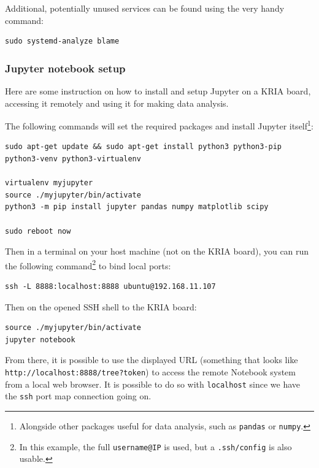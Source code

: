 \documentclass[10pt]{article}
\begin{document}
Additional, potentially unused services can be found using the very handy command:
\begin{verbatim}
sudo systemd-analyze blame
\end{verbatim}

\subsubsection{Jupyter notebook setup}
\label{sec:org242eb5c}
Here are some instruction on how to install and setup Jupyter on a KRIA board,
accessing it remotely and using it for making data analysis.

The following commands will set the required packages and install Jupyter itself\footnote{Alongside other packages useful for data analysis, such as \texttt{pandas} or \texttt{numpy}.}:
\begin{verbatim}
sudo apt-get update && sudo apt-get install python3 python3-pip python3-venv python3-virtualenv

virtualenv myjupyter
source ./myjupyter/bin/activate
python3 -m pip install jupyter pandas numpy matplotlib scipy

sudo reboot now
\end{verbatim}

Then in a terminal on your host machine (not on the KRIA board), you can run the following command\footnote{In this example, the full \texttt{username@IP} is used, but a \texttt{.ssh/config} is also usable.} to bind local ports:
\begin{verbatim}
ssh -L 8888:localhost:8888 ubuntu@192.168.11.107
\end{verbatim}

Then on the opened SSH shell to the KRIA board:
\begin{verbatim}
source ./myjupyter/bin/activate
jupyter notebook
\end{verbatim}

From there, it is possible to use the displayed URL (something that looks like
\texttt{http://localhost:8888/tree?token}) to access the remote Notebook system from a local web browser.
It is possible to do so with \texttt{localhost} since we have the \texttt{ssh} port map connection going on.
\end{document}

